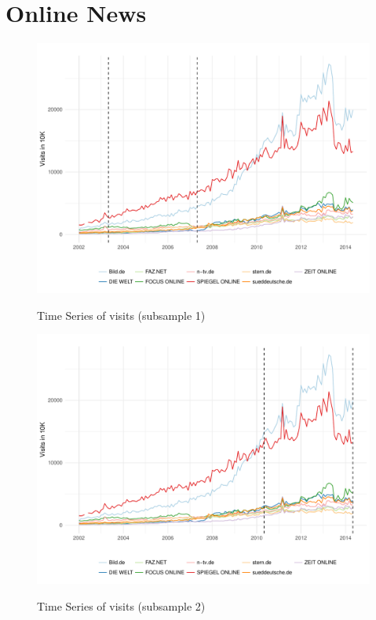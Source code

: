 \documentclass[12pt,a4paper,notitlepage]{article}
\begin{document}
\section{Online News} 

\begin{figure}[H]\centering
\caption{Time Series of visits (subsample 1)}
	\includegraphics[scale=.6]{../figs/fig_news1}
	\label{}
\end{figure}

\begin{figure}[H]\centering
\caption{Time Series of visits (subsample 2)}
	\includegraphics[scale=.6]{../figs/fig_news2}
	\label{}
\end{figure}
\end{document}
